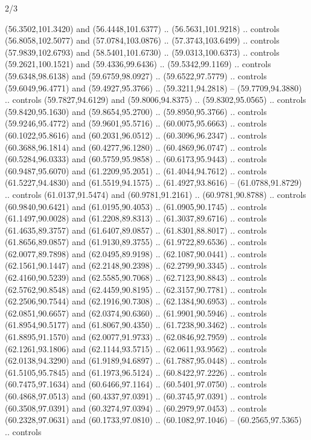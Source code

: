 \begin{flagdescription}{2/3}
\begin{scope}[shift={(0.5\flaglength,0.5)},scale=\flagwidth/320]
\begin{scope}[y=0.8pt, x=0.8pt, yscale=-1,shift={(-118.3,-146)}]
  (56.3502,101.3420) and (56.4448,101.6377) .. (56.5631,101.9218) .. controls
  (56.8058,102.5077) and (57.0784,103.0876) .. (57.3743,103.6499) .. controls
  (57.9839,102.6793) and (58.5401,101.6730) .. (59.0313,100.6373) .. controls
  (59.2621,100.1521) and (59.4336,99.6436) .. (59.5342,99.1169) .. controls
  (59.6348,98.6138) and (59.6759,98.0927) .. (59.6522,97.5779) .. controls
  (59.6049,96.4771) and (59.4927,95.3766) .. (59.3211,94.2818) --
  (59.7709,94.3880) .. controls (59.7827,94.6129) and (59.8006,94.8375) ..
  (59.8302,95.0565) .. controls (59.8420,95.1630) and (59.8654,95.2700) ..
  (59.8950,95.3766) .. controls (59.9246,95.4772) and (59.9601,95.5716) ..
  (60.0075,95.6663) .. controls (60.1022,95.8616) and (60.2031,96.0512) ..
  (60.3096,96.2347) .. controls (60.3688,96.1814) and (60.4277,96.1280) ..
  (60.4869,96.0747) .. controls (60.5284,96.0333) and (60.5759,95.9858) ..
  (60.6173,95.9443) .. controls (60.9487,95.6070) and (61.2209,95.2051) ..
  (61.4044,94.7612) .. controls (61.5227,94.4830) and (61.5519,94.1575) ..
  (61.4927,93.8616) -- (61.0788,91.8729) .. controls (61.0137,91.5474) and
  (60.9781,91.2161) .. (60.9781,90.8788) .. controls (60.9840,90.6421) and
  (61.0195,90.4053) .. (61.0905,90.1745) .. controls (61.1497,90.0028) and
  (61.2208,89.8313) .. (61.3037,89.6716) .. controls (61.4635,89.3757) and
  (61.6407,89.0857) .. (61.8301,88.8017) .. controls (61.8656,89.0857) and
  (61.9130,89.3755) .. (61.9722,89.6536) .. controls (62.0077,89.7898) and
  (62.0495,89.9198) .. (62.1087,90.0441) .. controls (62.1561,90.1447) and
  (62.2148,90.2398) .. (62.2799,90.3345) .. controls (62.4160,90.5239) and
  (62.5585,90.7068) .. (62.7123,90.8843) .. controls (62.5762,90.8548) and
  (62.4459,90.8195) .. (62.3157,90.7781) .. controls (62.2506,90.7544) and
  (62.1916,90.7308) .. (62.1384,90.6953) .. controls (62.0851,90.6657) and
  (62.0374,90.6360) .. (61.9901,90.5946) .. controls (61.8954,90.5177) and
  (61.8067,90.4350) .. (61.7238,90.3462) .. controls (61.8895,91.1570) and
  (62.0077,91.9733) .. (62.0846,92.7959) .. controls (62.1261,93.1806) and
  (62.1144,93.5715) .. (62.0611,93.9562) .. controls (62.0138,94.3290) and
  (61.9189,94.6897) .. (61.7887,95.0448) .. controls (61.5105,95.7845) and
  (61.1973,96.5124) .. (60.8422,97.2226) .. controls (60.7475,97.1634) and
  (60.6466,97.1164) .. (60.5401,97.0750) .. controls (60.4868,97.0513) and
  (60.4337,97.0391) .. (60.3745,97.0391) .. controls (60.3508,97.0391) and
  (60.3274,97.0394) .. (60.2979,97.0453) .. controls (60.2328,97.0631) and
  (60.1733,97.0810) .. (60.1082,97.1046) -- (60.2565,97.5365) .. controls

\end{scope}
\end{scope}
\end{flagdescription}
